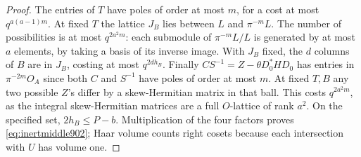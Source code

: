 \documentclass[a4paper,11pt]{article}
\theoremstyle{definition}
\theoremstyle{remark}
\numberwithin{equation}{section}
\begin{document}
\begin{proof}
The entries of \(T\) have poles of order at most \(m\), for a
cost at most \(q^{a(a-1)m}\). At fixed \(T\) the lattice \(J_B\)
lies between \(L\) and \(\pi^{-m}L\). The number of possibilities
is at most \(q^{2a^2m}\): each submodule of \(\pi^{-m}L/L\) is
generated by at most \(a\) elements, by taking a basis of its
inverse image. With \(J_B\) fixed, the \(d\) columns of \(B\)
are in \(J_B\), costing at most \(q^{2dh_B}\).
Finally \(CS^{-1}=Z-\theta D_0^*HD_0\) has entries in
\(\pi^{-2m}O_A\) since both \(C\) and \(S^{-1}\) have poles
of order at most \(m\). At fixed \(T,B\) any two possible \(Z\)'s
differ by a skew-Hermitian matrix in that ball. This costs
\(q^{2a^2m}\), as the integral skew-Hermitian matrices are a
full \(O\)-lattice of rank \(a^2\). On the specified set,
\(2h_B\le P-b\). Multiplication of the four factors proves
\eqref{eq:inertmiddle902}; Haar volume counts right cosets
because each intersection with \(U\) has volume one.
\end{proof}
\end{document}
